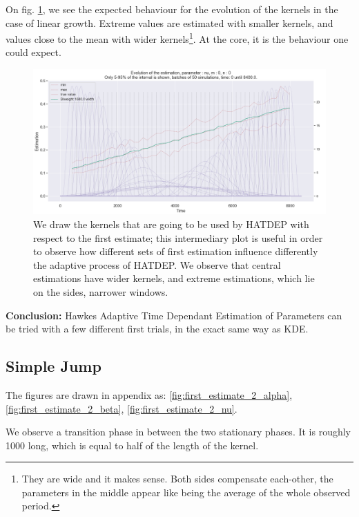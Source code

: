 On fig. \ref{fig:impact_g_linear}, we see the expected behaviour for the evolution of the kernels in the case of linear growth. Extreme values are estimated with smaller kernels, and values close to the mean with wider kernels\footnote{They are wide and it makes sense. Both sides compensate each-other, the parameters in the middle appear like being the average of the whole observed period.}. At the core, it is the behaviour one could expect.

\begin{figure}
\centering
\includegraphics[width = 0.90 \textwidth]{../imag/chap3/IMPACT_G/linear_growth_all_kernels.png}
\caption{We draw the kernels that are going to be used by HATDEP with respect to the first estimate; this intermediary plot is useful in order to observe how different sets of first estimation influence differently the adaptive process of HATDEP. We observe that central estimations have wider kernels, and extreme estimations, which lie on the sides, narrower windows.}
\label{fig:impact_g_linear}
\end{figure}


\textbf{Conclusion:} Hawkes Adaptive Time Dependant Estimation of Parameters can be tried with a few different first trials, in the exact same way as KDE.




\subsection{Simple Jump}
The figures are drawn in appendix as: \ref{fig:first_estimate_2_alpha}, \ref{fig:first_estimate_2_beta}, \ref{fig:first_estimate_2_nu}.

We observe a transition phase in between the two stationary phases. It is roughly 1000 long, which is equal to half of the length of the kernel.




